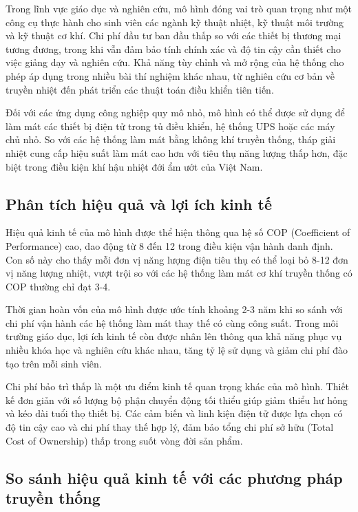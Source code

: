 \documentclass[../main.tex]{subfiles}
\begin{document}
Trong lĩnh vực giáo dục và nghiên cứu, mô hình đóng vai trò quan trọng như một công cụ thực hành cho sinh viên các ngành kỹ thuật nhiệt, kỹ thuật môi trường và kỹ thuật cơ khí. Chi phí đầu tư ban đầu thấp so với các thiết bị thương mại tương đương, trong khi vẫn đảm bảo tính chính xác và độ tin cậy cần thiết cho việc giảng dạy và nghiên cứu. Khả năng tùy chỉnh và mở rộng của hệ thống cho phép áp dụng trong nhiều bài thí nghiệm khác nhau, từ nghiên cứu cơ bản về truyền nhiệt đến phát triển các thuật toán điều khiển tiên tiến.

Đối với các ứng dụng công nghiệp quy mô nhỏ, mô hình có thể được sử dụng để làm mát các thiết bị điện tử trong tủ điều khiển, hệ thống UPS hoặc các máy chủ nhỏ. So với các hệ thống làm mát bằng không khí truyền thống, tháp giải nhiệt cung cấp hiệu suất làm mát cao hơn với tiêu thụ năng lượng thấp hơn, đặc biệt trong điều kiện khí hậu nhiệt đới ẩm ướt của Việt Nam.

\subsection{Phân tích hiệu quả và lợi ích kinh tế}
\label{sec:economic_efficiency_analysis}

Hiệu quả kinh tế của mô hình được thể hiện thông qua hệ số COP (Coefficient of Performance) cao, dao động từ 8 đến 12 trong điều kiện vận hành danh định. Con số này cho thấy mỗi đơn vị năng lượng điện tiêu thụ có thể loại bỏ 8-12 đơn vị năng lượng nhiệt, vượt trội so với các hệ thống làm mát cơ khí truyền thống có COP thường chỉ đạt 3-4.

Thời gian hoàn vốn của mô hình được ước tính khoảng 2-3 năm khi so sánh với chi phí vận hành các hệ thống làm mát thay thế có cùng công suất. Trong môi trường giáo dục, lợi ích kinh tế còn được nhân lên thông qua khả năng phục vụ nhiều khóa học và nghiên cứu khác nhau, tăng tỷ lệ sử dụng và giảm chi phí đào tạo trên mỗi sinh viên.

Chi phí bảo trì thấp là một ưu điểm kinh tế quan trọng khác của mô hình. Thiết kế đơn giản với số lượng bộ phận chuyển động tối thiểu giúp giảm thiểu hư hỏng và kéo dài tuổi thọ thiết bị. Các cảm biến và linh kiện điện tử được lựa chọn có độ tin cậy cao và chi phí thay thế hợp lý, đảm bảo tổng chi phí sở hữu (Total Cost of Ownership) thấp trong suốt vòng đời sản phẩm.

\subsection{So sánh hiệu quả kinh tế với các phương pháp truyền thống}
\label{sec:economic_comparison_traditional}
\end{document}
